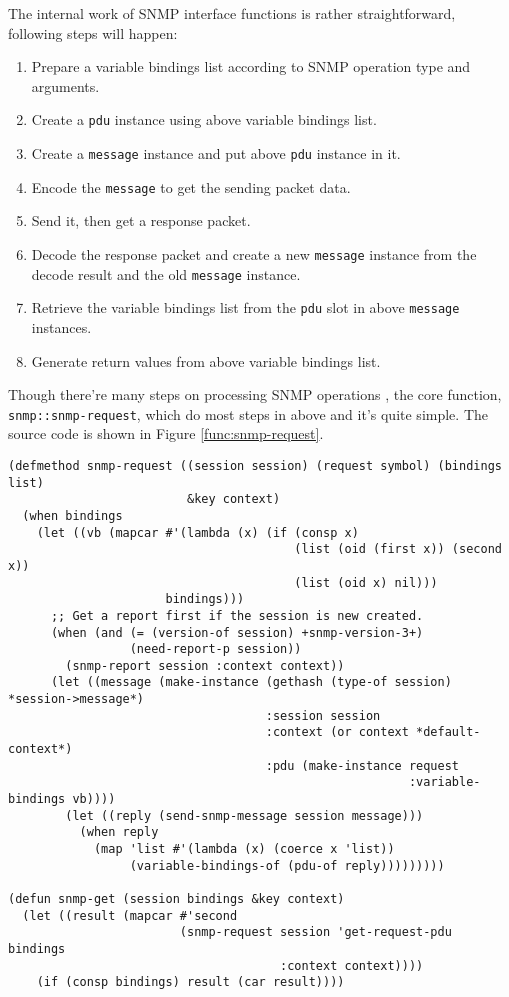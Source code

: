 \documentclass[reprint,9pt]{sigplanconf}
\begin{document}
The internal work of SNMP interface functions is rather
straightforward, following steps will happen:
\begin{enumerate}
\item Prepare a variable bindings list according to SNMP operation type and arguments.
\item Create a \texttt{pdu} instance using above variable bindings list.
\item Create a \texttt{message} instance and put above \texttt{pdu} instance in it.
\item Encode the \texttt{message} to get the sending packet data.
\item Send it, then get a response packet.
\item Decode the response packet and create a new \texttt{message} instance from the decode result and the old \texttt{message} instance.
\item Retrieve the variable bindings list from the \texttt{pdu} slot in above \texttt{message} instances.
\item Generate return values from above variable bindings list.
\end{enumerate}
Though there're many steps on processing SNMP operations
\cite{RFC:3412}, the core function,
\texttt{snmp::snmp-request}, which do most steps in above and it's quite simple.
The source code is shown in Figure \ref{func:snmp-request}.

\begin{figure*}
\begin{verbatim}
(defmethod snmp-request ((session session) (request symbol) (bindings list)
                         &key context)
  (when bindings
    (let ((vb (mapcar #'(lambda (x) (if (consp x)
                                        (list (oid (first x)) (second x))
                                        (list (oid x) nil)))
                      bindings)))
      ;; Get a report first if the session is new created.
      (when (and (= (version-of session) +snmp-version-3+)
                 (need-report-p session))
        (snmp-report session :context context))
      (let ((message (make-instance (gethash (type-of session) *session->message*)
                                    :session session
                                    :context (or context *default-context*)
                                    :pdu (make-instance request
                                                        :variable-bindings vb))))
        (let ((reply (send-snmp-message session message)))
          (when reply
            (map 'list #'(lambda (x) (coerce x 'list))
                 (variable-bindings-of (pdu-of reply)))))))))

(defun snmp-get (session bindings &key context)
  (let ((result (mapcar #'second
                        (snmp-request session 'get-request-pdu bindings
                                      :context context))))
    (if (consp bindings) result (car result))))
\end{verbatim}
  \caption{The core SNMP function: \texttt{snmp-request}}
  \label{func:snmp-request}
\end{figure*}
\end{document}
